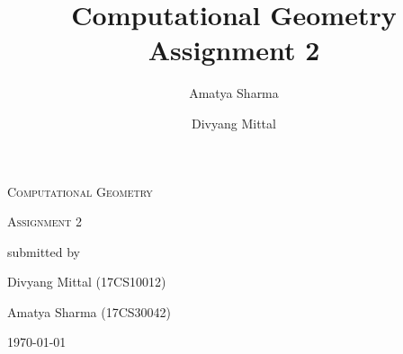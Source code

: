 \documentclass[8pt,english]{extarticle}
\title{Computational Geometry Assignment 2}
\author{Amatya Sharma \and Divyang Mittal}
\begin{document}
\begin{titlepage}
	\centering
	\vspace{4cm}
	{\scshape\LARGE Computational Geometry \par}
	\vspace{1cm}
	{\scshape\Large Assignment 2\par}

	\vfill
	submitted by\par
	Divyang Mittal (17CS10012) \par
	Amatya Sharma (17CS30042)

	\vfill

	{\large \today\par}
\end{titlepage}

\newpage






\newpage


\end{document}
